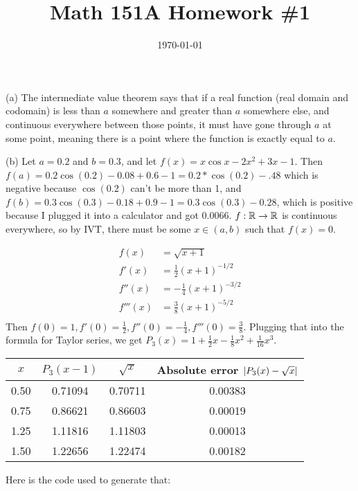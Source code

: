 \documentclass{article}
\date{\today}
\title{Math 151A Homework \#1}
\begin{document}
\maketitle

\begin{prob}
\end{prob}
(a) The intermediate value theorem says that if a real function (real domain and codomain) is less than $a$ somewhere and greater than $a$ somewhere else, and continuous everywhere between those points, it must have gone through $a$ at some point, meaning there is a point where the function is exactly equal to $a$.

\bigskip
(b) Let $a=0.2$ and $b=0.3$, and let $f(x)=x \cos x - 2x^2 +3x - 1$. Then $f(a)=0.2 \cos (0.2) - 0.08 + 0.6 - 1= 0.2 * \cos(0.2) -.48$ which is negative because $\cos(0.2)$ can't be more than 1, and $f(b)=0.3 \cos(0.3) - 0.18 + 0.9 - 1 = 0.3 \cos(0.3) -0.28$, which is positive because I plugged it into a calculator and got 0.0066. $f: \mathbb{R} \rightarrow \mathbb{R}$ is continuous everywhere, so by IVT, there must be some $x \in (a, b)$ such that $f(x)=0$.

\bigskip
\begin{prob}
\end{prob}
\begin{align*}
    f(x) &= \sqrt{x+1} \\
    f'(x) &= \frac{1}{2} (x+1)^{-1/2} \\
    f''(x) &= -\frac{1}{4} (x+1)^{-3/2} \\
    f'''(x) &= \frac{3}{8} (x+1)^{-5/2} \\
\end{align*}
Then $f(0)=1, f'(0)= \frac{1}{2}, f''(0)= - \frac{1}{4}, f'''(0)= \frac{3}{8}$. Plugging that into the formula for Taylor series, we get $P_3(x) = 1 + \frac{1}{2} x - \frac{1}{8} x^2 + \frac{1}{16} x^3$.
\begin{center}
    \begin{tabular}{|c|c|c|c|}
        \hline
        $x$ & $P_3(x - 1)$ & $\sqrt{x}$ & Absolute error $ \left\lvert P_3(x)-\sqrt{x} \right\rvert$ \\
        \hline
        \hline
        0.50 & 0.71094 & 0.70711 & 0.00383 \\
        \hline
        0.75 & 0.86621 & 0.86603 & 0.00019 \\
        \hline
        1.25 & 1.11816 & 1.11803 & 0.00013 \\
        \hline
        1.50 & 1.22656 & 1.22474 & 0.00182 \\
        \hline
    \end{tabular}
\end{center}
Here is the code used to generate that:
\end{document}
